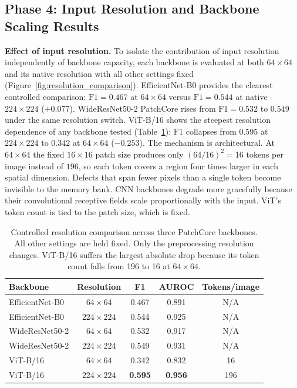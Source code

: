 \documentclass[11pt]{article}
\begin{document}
\subsection{Phase 4: Input Resolution and Backbone Scaling Results}

\textbf{Effect of input resolution.}
To isolate the contribution of input resolution independently of backbone capacity,
each backbone is evaluated at both $64\!\times\!64$ and its native resolution with all other settings fixed
(Figure~\ref{fig:resolution_comparison}).
EfficientNet-B0 provides the clearest controlled comparison: $\mathrm{F1}=0.467$ at $64\!\times\!64$
versus $\mathrm{F1}=0.544$ at native $224\!\times\!224$ ($+0.077$).
WideResNet50-2 PatchCore rises from $\mathrm{F1}=0.532$ to $0.549$ under the same resolution switch.
ViT-B/16 shows the steepest resolution dependence of any backbone tested
(Table~\ref{tab:vit_resolution}): $\mathrm{F1}$ collapses from $0.595$ at $224\!\times\!224$ to $0.342$
at $64\!\times\!64$ ($-0.253$).
The mechanism is architectural. At $64\!\times\!64$ the fixed $16\!\times\!16$ patch size produces only
$(64/16)^{2}=16$ tokens per image instead of $196$, so each token covers a region four times larger
in each spatial dimension. Defects that span fewer pixels than a single token become invisible to
the memory bank. CNN backbones degrade more gracefully because their convolutional receptive fields
scale proportionally with the input. ViT's token count is tied to the patch size, which is fixed.

\begin{table}[H]
\centering
\caption{Controlled resolution comparison across three PatchCore backbones. All other settings are
held fixed. Only the preprocessing resolution changes. ViT-B/16 suffers the largest absolute drop
because its token count falls from 196 to 16 at $64\!\times\!64$.}
\label{tab:vit_resolution}
\begin{tabular}{lcccc}
\toprule
Backbone & Resolution & F1 & AUROC & Tokens/image \\
\midrule
EfficientNet-B0 & $64\!\times\!64$   & 0.467 & 0.891 & N/A \\
EfficientNet-B0 & $224\!\times\!224$ & 0.544 & 0.925 & N/A \\
\midrule
WideResNet50-2  & $64\!\times\!64$   & 0.532 & 0.917 & N/A \\
WideResNet50-2  & $224\!\times\!224$ & 0.549 & 0.931 & N/A \\
\midrule
ViT-B/16        & $64\!\times\!64$   & 0.342 & 0.832 & 16 \\
ViT-B/16        & $224\!\times\!224$ & \textbf{0.595} & \textbf{0.956} & 196 \\
\bottomrule
\end{tabular}
\end{table}
\end{document}
